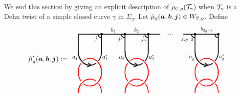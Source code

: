 \documentclass[11pt]{article}
\begin{document}
We end this section by giving an explicit description of $\RTrep{\cC}{g}(\dt_\gamma)$ when $\dt_\gamma$ is a Dehn twist of  a simple closed curve $\gamma$ in $\Sigma_g$. Let $\hat{\mu}_g(\bm{a}, \bm{b}, \bm{j}) \in W_{\mathcal{C},g}$. Define
\begin{equation}\label{eq:rib-graph}
\hmu'_{g}(\bm{a}, \bm{b}, \bm{j}) := 
\vcenter{\hbox{\scalebox{0.6}{
\begin{tikzpicture}[line width=2pt]
\begin{scope}[shift={(-1,-1)}]
\draw (0,2)--(7,2); \draw(9,2)--(12,2);
\node[left] at (0.1,0) {\Large $a_1^{\phantom{*}}$};
\node[right] at (1.9,0) {\Large $a_1^{*}$};
\node[left] at (4.1,0) {\Large $a_2^{\phantom{*}}$};
\node[right] at (5.9,0) {\Large $a_2^{{*}}$};
\node[left] at (10.1,0) {\Large $a_g^{\phantom{*}}$};
\node[right] at (11.9,0) {\Large $a_g^{{*}}$};
\foreach \x in {0,1,2,3,5,6}{\draw (2*\x, 2)--(2*\x,0.5);}
\foreach\x in {1,2,3,5,6}
{\begin{scope}[shift={(2*\x, 2)}]
\draw ([shift=(180:0.3cm)]0,0) arc (180:270:0.3cm);
\fill[black] (0,0) circle (3pt);
\end{scope}}
\foreach\x in {1,2,3}{\node[left] at (2*\x-0.05,1.6) {\Large $j_{\x}$};}
\node[left]at(10,1.6){\Large $j_{2g-2}$};
\node[above] at (3,2) {\Large $b_1$};
\node[above] at (5,2) {\Large $b_2$};
\node[above] at (11,2) {\Large $b_{2g-2}$};	
\end{scope}
\foreach\x in {0,4,10}
{\begin{scope}[shift={(1+\x,-2.28)}, xscale=2, yscale=1.2]
\draw[red] (0,0) arc (0:180:0.5 and 1);  
\draw (0,1.5) arc (360:180:0.5 and 1);
\fill[white] (-0.18,0.73) circle (3pt);  
\fill[white] (-0.82,0.73) circle (3pt);  
\draw[red] (0,0) arc (0:90:0.5 and 1);  
\draw (-0.5,0.5) arc (270:180:0.5 and 1);
\draw(-0.45,0.5)--++(-0.13,0.18);\draw(-0.45,0.5)--++(-0.18,-0.13);
\end{scope}
\begin{scope}[shift={(1+\x,-2.28)}, yscale=-1.2, xscale=2
]
\draw[red] (0,0) arc (0:180:0.5 and 1);  
\draw[red] (0,1.5) arc (360:180:0.5 and 1);
\fill[white] (-0.18,0.73) circle (3pt);  
\fill[white] (-0.82,0.73) circle (3pt);  
\draw[red] (0,0) arc (0:90:0.5 and 1);  
\draw[red] (-0.5,0.5) arc (270:180:0.5 and 1);
\end{scope}}
\foreach\x in {1,2,3}{\fill[black] (6.5+0.2*\x,1) circle (1pt);}
\end{tikzpicture}}}}
\end{equation}
\end{document}
